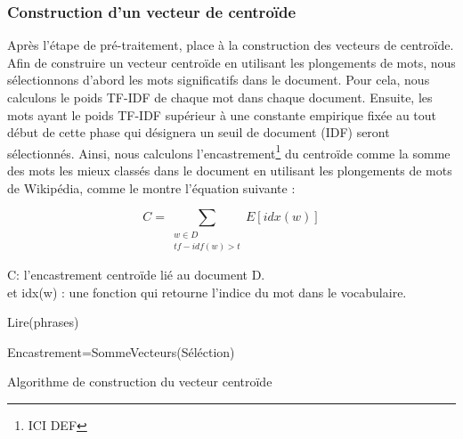        \subsubsection{Construction d'un vecteur de centroïde}
        Après l'étape de pré-traitement, place à la construction des vecteurs de centroïde. Afin de construire un vecteur centroïde en utilisant les plongements de mots, nous sélectionnons d'abord les mots significatifs dans le document. Pour cela, nous calculons le poids TF-IDF de chaque mot dans chaque document. Ensuite, les mots ayant le poids TF-IDF supérieur à une constante empirique fixée au tout début de cette phase qui désignera un seuil de document (IDF) seront sélectionnés. Ainsi, nous calculons l'encastrement\footnote{ICI DEF} du centroïde comme la somme des mots les mieux classés dans le document en utilisant les plongements de mots de Wikipédia, comme le montre l'équation suivante :

             \begin{equation*}
             C = \sum_{\substack{w\in D\\
                             tf-idf(w)>t }}
                    E[idx(w)]
             \end{equation*}
             
             C: l'encastrement centroïde lié au document D.\\
             et idx(w) : une fonction qui retourne l'indice du mot dans le vocabulaire.\\
             
             \begin{algorithm2e}[H]
                \SetAlgoLined
                
                Lire(phrases)\\
                
                Encastrement=SommeVecteurs(Séléction)
                
                \caption{Algorithme de construction du vecteur centroïde}
             \end{algorithm2e}
             
